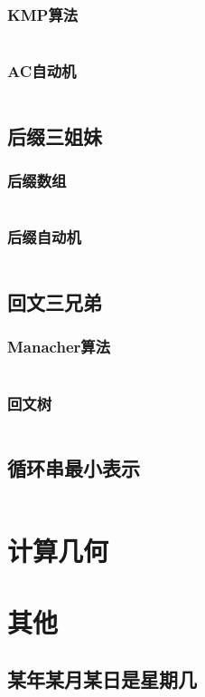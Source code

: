 \documentclass[a4paper]{article}
\newcommand{\cppcode}[1]{
    \inputminted[mathescape]{cpp}{source/#1}
}
\begin{document}
\subsubsection{KMP算法}

\cppcode{string-manipulation/knuth-morris-pratt.cpp}

\subsubsection{AC自动机}

\cppcode{string-manipulation/aho-corasick-automation.cpp}

\subsection{后缀三姐妹}

\subsubsection{后缀数组}

\cppcode{string-manipulation/suffix-array.cpp}

\subsubsection{后缀自动机}

\cppcode{string-manipulation/suffix-automation.cpp}

\subsection{回文三兄弟}

\subsubsection{Manacher算法}

\cppcode{string-manipulation/manacher.cpp}

\subsubsection{回文树}

\cppcode{string-manipulation/palindrome-tree.cpp}

\subsection{循环串最小表示}

\cppcode{string-manipulation/minimum-circular-representation.cpp}

\section{计算几何}

\section{其他}

\subsection{某年某月某日是星期几}

\cppcode{miscellany/what-day-is-today.cpp}
\end{document}
